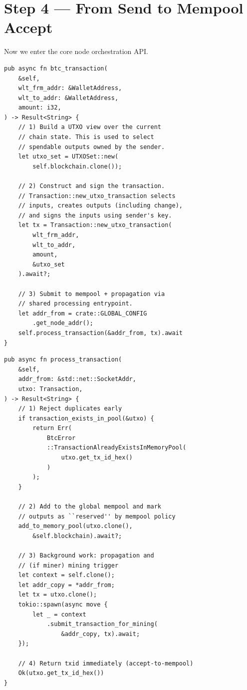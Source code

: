 \section{Step 4 --- From Send to Mempool Accept}
\label{sec:ch09-9-step4}

Now we enter the core node orchestration API.

\begin{listing}[htbp]
\caption{Create and submit signed UTXO transaction ()}
\label{lst:9-9-8}
\begin{verbatim}
pub async fn btc_transaction(
    &self,
    wlt_frm_addr: &WalletAddress,
    wlt_to_addr: &WalletAddress,
    amount: i32,
) -> Result<String> {
    // 1) Build a UTXO view over the current
    // chain state. This is used to select
    // spendable outputs owned by the sender.
    let utxo_set = UTXOSet::new(
        self.blockchain.clone());

    // 2) Construct and sign the transaction.
    // Transaction::new_utxo_transaction selects
    // inputs, creates outputs (including change),
    // and signs the inputs using sender's key.
    let tx = Transaction::new_utxo_transaction(
        wlt_frm_addr,
        wlt_to_addr,
        amount,
        &utxo_set
    ).await?;

    // 3) Submit to mempool + propagation via
    // shared processing entrypoint.
    let addr_from = crate::GLOBAL_CONFIG
        .get_node_addr();
    self.process_transaction(&addr_from, tx).await
}
\end{verbatim}
\end{listing}

\begin{listing}[htbp]
\caption{Mempool acceptance entrypoint ()}
\label{lst:9-9-9}
\begin{verbatim}
pub async fn process_transaction(
    &self,
    addr_from: &std::net::SocketAddr,
    utxo: Transaction,
) -> Result<String> {
    // 1) Reject duplicates early
    if transaction_exists_in_pool(&utxo) {
        return Err(
            BtcError
            ::TransactionAlreadyExistsInMemoryPool(
                utxo.get_tx_id_hex()
            )
        );
    }

    // 2) Add to the global mempool and mark
    // outputs as ``reserved'' by mempool policy
    add_to_memory_pool(utxo.clone(),
        &self.blockchain).await?;

    // 3) Background work: propagation and
    // (if miner) mining trigger
    let context = self.clone();
    let addr_copy = *addr_from;
    let tx = utxo.clone();
    tokio::spawn(async move {
        let _ = context
            .submit_transaction_for_mining(
                &addr_copy, tx).await;
    });

    // 4) Return txid immediately (accept-to-mempool)
    Ok(utxo.get_tx_id_hex())
}
\end{verbatim}
\end{listing}

